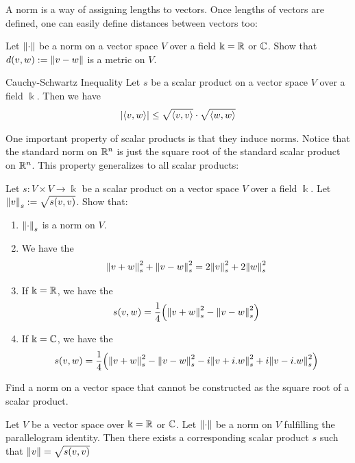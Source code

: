 A norm is a way of assigning lengths to vectors. Once lengths of vectors are defined, one can easily define distances between vectors too:
\begin{exercise}
	Let $\norm{\cdot}$ be a norm on a vector space $V$ over a field $\Bbbk = \mathbb{R}$ or $\mathbb{C}$. Show that $d(v,w) := \norm{v - w}$ is a metric on $V$.
\end{exercise}
\begin{importanttheorem}{Cauchy-Schwartz Inequality}{}
	Let $s$ be a scalar product on a vector space $V$ over a field $\Bbbk$. Then we have
	\begin{align*}
		\abs{\left\langle v, w \right\rangle} \leq \sqrt{\left\langle v, v \right\rangle} \cdot \sqrt{\left\langle w, w \right\rangle}
	\end{align*}
\end{importanttheorem}
One important property of scalar products is that they induce norms. Notice that the standard norm on $\mathbb{R}^n$ is just the square root of the standard scalar product on $\mathbb{R}^n$. This property generalizes to all scalar products:
\begin{exercise}
	Let $s : V \times V \to \Bbbk$ be a scalar product on a vector space $V$ over a field $\Bbbk$. Let $\norm{v}_s := \sqrt{s(v,v)}$. Show that:
	\begin{enumerate}
		\item $\norm{\cdot}_s$ is a norm on $V$.
		\item We have the 
		\begin{align*}
			\norm{v + w}^2_s + \norm{v - w}^2_s = 2\norm{v}_s^2 + 2 \norm{w}_s^2
		\end{align*}
		\item If $\Bbbk = \mathbb{R}$, we have the  \begin{align*}
			s(v,w) = \frac{1}{4}\qty(\norm{v + w}_s^2 - \norm{v - w}_s^2)
		\end{align*}
		\item If $\Bbbk = \mathbb{C}$, we have the  \begin{align*}
			s(v,w) = \frac{1}{4}\qty(\norm{v + w}_s^2 - \norm{v - w}_s^2
			- i\norm{v + i.w}_s^2 + i\norm{v-i.w}_s^2)
		\end{align*}
	\end{enumerate}
\end{exercise}
\begin{exercise}
	Find a norm on a vector space that cannot be constructed as the square root of a scalar product.
\end{exercise}
\begin{theorem}
	Let $V$ be a vector space over $\Bbbk = \mathbb{R}$ or $\mathbb{C}$. Let $\norm{\cdot}$ be a norm on $V$ fulfilling the parallelogram identity. Then there exists a corresponding scalar product $s$ such that $\norm{v} = \sqrt{s(v,v)}$
\end{theorem}
